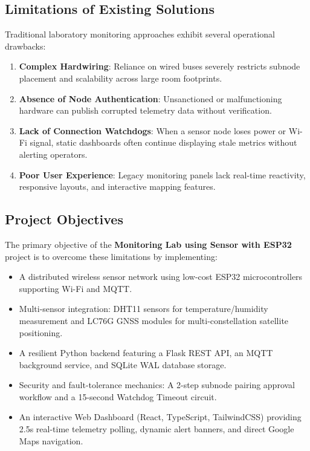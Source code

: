 \documentclass[11pt,a4paper]{article}
\begin{document}
\subsection{Limitations of Existing Solutions}
Traditional laboratory monitoring approaches exhibit several operational drawbacks:
\begin{enumerate}
    \item \textbf{Complex Hardwiring}: Reliance on wired buses severely restricts subnode placement and scalability across large room footprints.
    \item \textbf{Absence of Node Authentication}: Unsanctioned or malfunctioning hardware can publish corrupted telemetry data without verification.
    \item \textbf{Lack of Connection Watchdogs}: When a sensor node loses power or Wi-Fi signal, static dashboards often continue displaying stale metrics without alerting operators.
    \item \textbf{Poor User Experience}: Legacy monitoring panels lack real-time reactivity, responsive layouts, and interactive mapping features.
\end{enumerate}

\subsection{Project Objectives}
The primary objective of the \textbf{Monitoring Lab using Sensor with ESP32} project is to overcome these limitations by implementing:
\begin{itemize}
    \item A distributed wireless sensor network using low-cost ESP32 microcontrollers supporting Wi-Fi and MQTT.
    \item Multi-sensor integration: DHT11 sensors for temperature/humidity measurement and LC76G GNSS modules for multi-constellation satellite positioning.
    \item A resilient Python backend featuring a Flask REST API, an MQTT background service, and SQLite WAL database storage.
    \item Security and fault-tolerance mechanics: A 2-step subnode pairing approval workflow and a 15-second Watchdog Timeout circuit.
    \item An interactive Web Dashboard (React, TypeScript, TailwindCSS) providing 2.5s real-time telemetry polling, dynamic alert banners, and direct Google Maps navigation.
\end{itemize}
\end{document}
